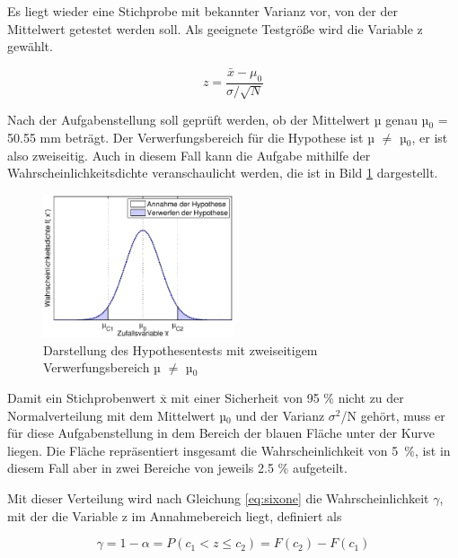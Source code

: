 \noindent Es liegt wieder eine Stichprobe mit bekannter Varianz vor, von der der Mittelwert getestet werden soll. Als geeignete Testgr\"{o}{\ss}e wird die Variable z gew\"{a}hlt.

\begin{equation}\label{eq:sixthirtytwo}
z=\dfrac{\bar{x}-\mu _{0} }{\sigma /\sqrt{N} }
\end{equation}

\noindent Nach der Aufgabenstellung soll gepr\"{u}ft werden, ob der Mittelwert µ genau µ$_{0}$ = 50.55 mm betr\"{a}gt. Der Verwerfungsbereich f\"{u}r die Hypothese ist µ $\neq$ µ$_{0}$, er ist also zweiseitig. Auch in diesem Fall kann die Aufgabe mithilfe der Wahrscheinlichkeitsdichte veranschaulicht werden, die ist in Bild \ref{fig:HypothesentestBeidseitigerVerwerfungsbereich} dargestellt.

\noindent 
\begin{figure}[H]
  \centerline{\includegraphics[width=0.5\textwidth]{Kapitel6/Bilder/image7}}
  \caption{Darstellung des Hypothesentests mit zweiseitigem Verwerfungsbereich µ $\neq$ µ$_{0}$}
  \label{fig:HypothesentestBeidseitigerVerwerfungsbereich}
\end{figure}

\noindent Damit ein Stichprobenwert $\overline{\mathrm{x}}$ mit einer Sicherheit von 95 \% nicht zu der Normalverteilung mit dem Mittelwert µ{}$_{0}$ und der Varianz $\sigma^{2}$/N geh\"{o}rt, muss er f\"{u}r diese Aufgabenstellung in dem Bereich der blauen Fl\"{a}che unter der Kurve liegen. Die Fl\"{a}che repr\"{a}sentiert insgesamt die Wahrscheinlichkeit von 5~\%, ist in diesem Fall aber in zwei Bereiche von jeweils 2.5 \% aufgeteilt. \newline

\noindent Mit dieser Verteilung wird nach Gleichung \eqref{eq:sixone} die Wahrscheinlichkeit $\gamma$, mit der die Variable z im Annahmebereich liegt, definiert als

\begin{equation}\label{eq:sixthirtythree}
\gamma =1-\alpha =P(c_{1} <z\le c_{2})=F(c_{2} )-F(c_{1})
\end{equation}

